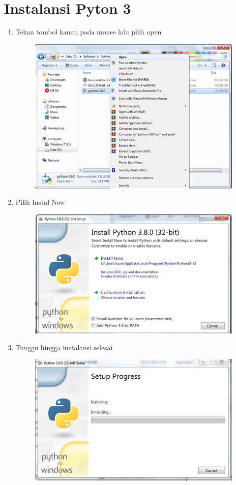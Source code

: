 \section{Instalansi Pyton 3}
\begin{enumerate}
    \item Tekan tombol kanan pada mouse lalu pilih open 

\begin{figure}[!htbp]
    \centering
    \includegraphics[scale=0.5]{figures/1.png}
    \label{visimisi}
\end{figure}

    \item Pilih Instal Now
    \begin{figure}[!htbp]
    \centering
    \includegraphics[scale=0.5]{figures/2.png}
    \label{visimisi}
\end{figure}


    \item Tunggu hingga instalansi selesai
    \begin{figure}[!htbp]
    \centering
    \includegraphics[scale=0.5]{figures/3.png}
    \label{visimisi}
\end{figure}
\end{enumerate}
